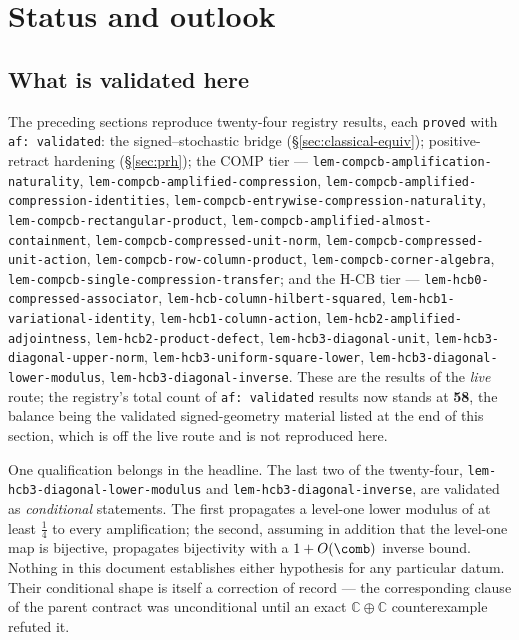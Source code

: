 \section{Status and outlook}\label{sec:status-outlook}

\subsection*{What is validated here}

The preceding sections reproduce twenty-four registry results, each \texttt{proved} with
\texttt{af: validated}: the signed--stochastic bridge (\S\ref{sec:classical-equiv});
positive-retract hardening (\S\ref{sec:prh}); the COMP tier ---
\texttt{lem-compcb-amplification-naturality},
\texttt{lem-compcb-amplified-compression},
\texttt{lem-compcb-amplified-compression-identities},
\texttt{lem-compcb-entrywise-compression-naturality},
\texttt{lem-compcb-rectangular-product},
\texttt{lem-compcb-amplified-almost-containment},
\texttt{lem-compcb-compressed-unit-norm},
\texttt{lem-compcb-compressed-unit-action},
\texttt{lem-compcb-row-column-product},
\texttt{lem-compcb-corner-algebra},
\texttt{lem-compcb-single-compression-transfer};
and the H-CB tier ---
\texttt{lem-hcb0-compressed-associator},
\texttt{lem-hcb-column-hilbert-squared},
\texttt{lem-hcb1-variational-identity},
\texttt{lem-hcb1-column-action},
\texttt{lem-hcb2-amplified-adjointness},
\texttt{lem-hcb2-product-defect},
\texttt{lem-hcb3-diagonal-unit},
\texttt{lem-hcb3-diagonal-upper-norm},
\texttt{lem-hcb3-uniform-square-lower},
\texttt{lem-hcb3-diagonal-lower-modulus},
\texttt{lem-hcb3-diagonal-inverse}.
These are the results of the \emph{live} route; the registry's total count of
\texttt{af: validated} results now stands at \textbf{58}, the balance being the validated
signed-geometry material listed at the end of this section, which is off the live route
and is not reproduced here.

One qualification belongs in the headline. The last two of the twenty-four,
\texttt{lem-hcb3-diagonal-lower-modulus} and \texttt{lem-hcb3-diagonal-inverse}, are
validated as \emph{conditional} statements. The first propagates a level-one lower
modulus of at least $\tfrac14$ to every amplification; the second, assuming in addition
that the level-one map is bijective, propagates bijectivity with a $1+O(\comb)$ inverse
bound. Nothing in this document establishes either hypothesis for any particular datum.
Their conditional shape is itself a correction of record --- the corresponding clause of
the parent contract was unconditional until an exact $\mathbb C\oplus\mathbb C$
counterexample refuted it.

